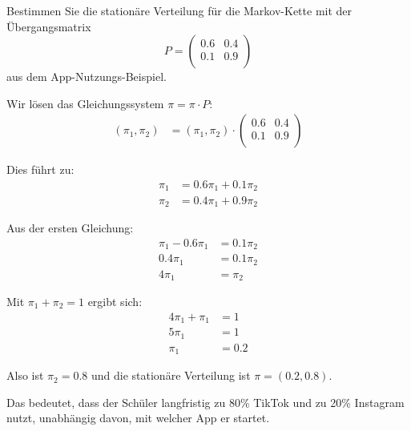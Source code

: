 \begin{myexercise}
    Bestimmen Sie die stationäre Verteilung für die Markov-Kette mit der Übergangsmatrix
    \[
        P = \begin{pmatrix}
            0.6 & 0.4 \\
            0.1 & 0.9 \\
        \end{pmatrix}
    \]
    aus dem App-Nutzungs-Beispiel.

    \begin{myanswer}
        Wir lösen das Gleichungssystem $\pi = \pi \cdot P$:
        \begin{align}
            (\pi_1, \pi_2) & = (\pi_1, \pi_2) \cdot
            \begin{pmatrix}
                0.6 & 0.4 \\
                0.1 & 0.9 \\
            \end{pmatrix}
        \end{align}

        Dies führt zu:
        \begin{align}
            \pi_1 & = 0.6\pi_1 + 0.1\pi_2 \\
            \pi_2 & = 0.4\pi_1 + 0.9\pi_2
        \end{align}

        Aus der ersten Gleichung:
        \begin{align}
            \pi_1 - 0.6\pi_1 & = 0.1\pi_2 \\
            0.4\pi_1         & = 0.1\pi_2 \\
            4\pi_1           & = \pi_2
        \end{align}

        Mit $\pi_1 + \pi_2 = 1$ ergibt sich:
        \begin{align}
            4\pi_1 + \pi_1 & = 1   \\
            5\pi_1         & = 1   \\
            \pi_1          & = 0.2
        \end{align}

        Also ist $\pi_2 = 0.8$ und die stationäre Verteilung ist $\pi = (0.2, 0.8)$.

        Das bedeutet, dass der Schüler langfristig zu 80\% TikTok und zu 20\% Instagram nutzt, unabhängig davon, mit welcher App er startet.
    \end{myanswer}
\end{myexercise}


